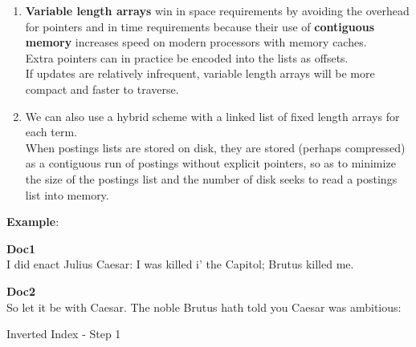 \begin{enumerate}
\begin{enumerate}
        \item \textbf{Variable length arrays} win in space requirements by avoiding the overhead for pointers and in time requirements because their use of \textbf{contiguous memory} increases speed on modern processors with memory caches.\\
        Extra pointers can in practice be encoded into the lists as offsets.\\
        If updates are relatively infrequent, variable length arrays will be more compact and faster to traverse.

        \item We can also use a hybrid scheme with a linked list of fixed length arrays for each term.\\
        When postings lists are stored on disk, they are stored (perhaps compressed) as a contiguous run of postings without explicit pointers, so as to minimize the size of the postings list and the number of disk seeks to read a postings list into memory.
    \end{enumerate}

    
\end{enumerate}

\noindent \textbf{Example}:
\begin{table}[h]
    \begin{minipage}[t]{.45\linewidth}
        \textbf{Doc1}\\
        I did enact Julius Caesar: I was killed i’ the Capitol; Brutus killed me.
    \end{minipage}
    \hfill
    \begin{minipage}[t]{.45\linewidth}
        \textbf{Doc2}\\
        So let it be with Caesar. The noble Brutus hath told you Caesar was ambitious:
    \end{minipage}
    \caption{Inverted Index - Step 1}
\end{table}

